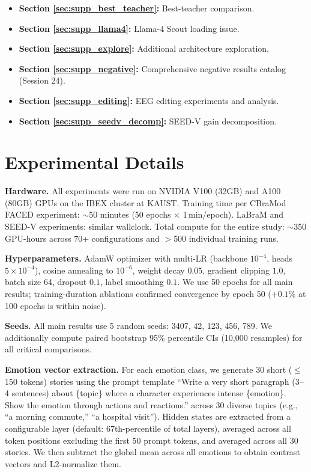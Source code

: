 \begin{itemize}
    \item \textbf{Section \ref{sec:supp_best_teacher}:} Best-teacher comparison.
    \item \textbf{Section \ref{sec:supp_llama4}:} Llama-4 Scout loading issue.
    \item \textbf{Section \ref{sec:supp_explore}:} Additional architecture exploration.
    \item \textbf{Section \ref{sec:supp_negative}:} Comprehensive negative results catalog (Session 24).
    \item \textbf{Section \ref{sec:supp_editing}:} EEG editing experiments and analysis.
    \item \textbf{Section \ref{sec:supp_seedv_decomp}:} SEED-V gain decomposition.
\end{itemize}

\section{Experimental Details}
\label{sec:supp_exp}

\noindent\textbf{Hardware.} All experiments were run on NVIDIA V100 (32GB) and A100 (80GB) GPUs on the IBEX cluster at KAUST. Training time per CBraMod FACED experiment: $\sim$50 minutes (50 epochs $\times$ 1\,min/epoch). LaBraM and SEED-V experiments: similar wallclock. Total compute for the entire study: $\sim$350 GPU-hours across 70+ configurations and $>$500 individual training runs.

\noindent\textbf{Hyperparameters.} AdamW optimizer with multi-LR (backbone $10^{-4}$, heads $5 \times 10^{-4}$), cosine annealing to $10^{-6}$, weight decay $0.05$, gradient clipping $1.0$, batch size 64, dropout $0.1$, label smoothing $0.1$. We use 50 epochs for all main results; training-duration ablations confirmed convergence by epoch 50 ($+0.1\%$ at 100 epochs is within noise).

\noindent\textbf{Seeds.} All main results use 5 random seeds: 3407, 42, 123, 456, 789. We additionally compute paired bootstrap 95\% percentile CIs (10{,}000 resamples) for all critical comparisons.

\noindent\textbf{Emotion vector extraction.} For each emotion class, we generate 30 short ($\leq$150 tokens) stories using the prompt template ``Write a very short paragraph (3--4 sentences) about \{topic\} where a character experiences intense \{emotion\}. Show the emotion through actions and reactions.'' across 30 diverse topics (e.g., ``a morning commute,'' ``a hospital visit''). Hidden states are extracted from a configurable layer (default: 67th-percentile of total layers), averaged across all token positions excluding the first 50 prompt tokens, and averaged across all 30 stories. We then subtract the global mean across all emotions to obtain contrast vectors and L2-normalize them.

